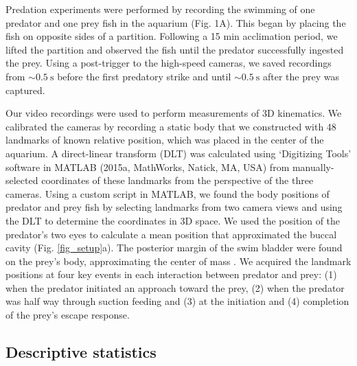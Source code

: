 \documentclass[]{rsos}%
\begin{document}
Predation experiments were performed by recording the swimming of one predator and one prey fish in the aquarium (Fig. 1A). 
This began by placing the fish on opposite sides of a partition.
Following a 15 min acclimation period, we lifted the partition and observed the fish until the predator successfully ingested the prey.
Using a post-trigger to the high-speed cameras, we saved recordings from $\sim \SI{0.5}{\s}$ before the first predatory strike and until $\sim \SI{0.5}{\s}$  after the prey was captured.

Our video recordings were used to perform measurements of 3D kinematics. 
We calibrated the cameras by recording a static body that we constructed with 48 landmarks of known relative position, which was placed in the center of the aquarium.
A direct-linear transform (DLT) was calculated using `Digitizing Tools' software in MATLAB (2015a, MathWorks, Natick, MA, USA) \cite{Hedrick:2008wz} from manually-selected coordinates of these landmarks from the perspective of the three cameras.
Using a custom script in MATLAB, we found the body positions of predator and prey fish by selecting landmarks from two camera views and using the DLT to determine the coordinates in 3D space.
We used the position of the predator's two eyes to calculate a mean position that approximated the buccal cavity (Fig. \ref{fig_setup}a).
The posterior margin of the swim bladder were found on the prey's body, approximating the center of mass \cite{Stewart:2010ig}.
We acquired the landmark positions at four key events in each interaction between predator and prey: (1) when the predator initiated an approach toward the prey, (2) when the predator  was half way through suction feeding and (3) at the initiation and (4) completion of the prey's escape response.


\subsection{Descriptive statistics}
\end{document}
